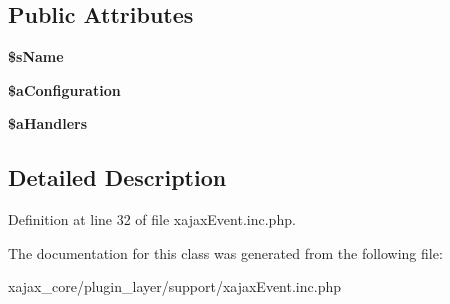 \subsection*{Public Attributes}
\begin{DoxyCompactItemize}
\item 
\hypertarget{classxajaxEvent_aea81fdafb991b32613002861b27d4f78}{
{\bfseries \$sName}}
\label{classxajaxEvent_aea81fdafb991b32613002861b27d4f78}

\item 
\hypertarget{classxajaxEvent_a5ee95d3e5adfbffc813f7daaf812110a}{
{\bfseries \$aConfiguration}}
\label{classxajaxEvent_a5ee95d3e5adfbffc813f7daaf812110a}

\item 
\hypertarget{classxajaxEvent_a18b17e102fb40f184cb0206f25e068a0}{
{\bfseries \$aHandlers}}
\label{classxajaxEvent_a18b17e102fb40f184cb0206f25e068a0}

\end{DoxyCompactItemize}


\subsection{Detailed Description}


Definition at line 32 of file xajaxEvent.inc.php.



The documentation for this class was generated from the following file:\begin{DoxyCompactItemize}
\item 
xajax\_\-core/plugin\_\-layer/support/xajaxEvent.inc.php\end{DoxyCompactItemize}
